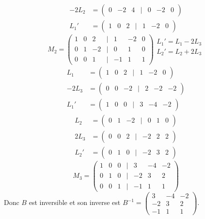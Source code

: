 \documentclass[a4paper,12pt]{article}
\begin{document}
{\[\begin{aligned}
-2L_2 &= \begin{pmatrix}
0 & -2 & 4 & | & 0 & -2 & 0
\end{pmatrix} \\
L_1' &= \begin{pmatrix}
1 & 0 & 2 & | & 1 & -2 & 0
\end{pmatrix}
\end{aligned}
\]
\[ M_2 = 
\begin{pmatrix}
1 & 0 & 2 & | & 1 & -2 & 0 \\
0 & 1 & -2 & | & 0 & 1 & 0 \\
0 & 0 & \boxed{1} & | & -1 & 1 & 1
\end{pmatrix} 
\begin{array}{c} L_1' = L_1-2L_3 \\
L_2' = L_2+2L_3 \\ \\
\end{array}
\]
\[
\begin{aligned}
L_1 &= \begin{pmatrix}
1 & 0 & 2 & | & 1 & -2 & 0
\end{pmatrix} \\
-2L_3 &= \begin{pmatrix}
0 & 0 & -2 & | & 2 & -2 & -2
\end{pmatrix} \\
L_1' &= \begin{pmatrix}
1 & 0 & 0 & | & 3 & -4 & -2
\end{pmatrix}
\end{aligned}
\]
\[
\begin{aligned}
L_2 &= \begin{pmatrix}
0 & 1 & -2 & | & 0 & 1 & 0
\end{pmatrix} \\
2L_3 &= \begin{pmatrix}
0 & 0 & 2 & | & -2 & 2 & 2
\end{pmatrix} \\
L_2' &= \begin{pmatrix}
0 & 1 & 0 & | & -2 & 3 & 2
\end{pmatrix}
\end{aligned}
\]
\[ M_3 = 
\begin{pmatrix}
1 & 0 & 0 & | & 3 & -4 & -2 \\
0 & 1 & 0 & | & -2 & 3 & 2 \\
0 & 0 & 1 & | & -1 & 1 & 1
\end{pmatrix} 
\]
Donc $B$ est inversible et son inverse est \( B^{-1} = \begin{pmatrix}
3 & -4 & -2 \\
-2 & 3 & 2 \\
-1 & 1 & 1
\end{pmatrix} \).
}
\end{document}
